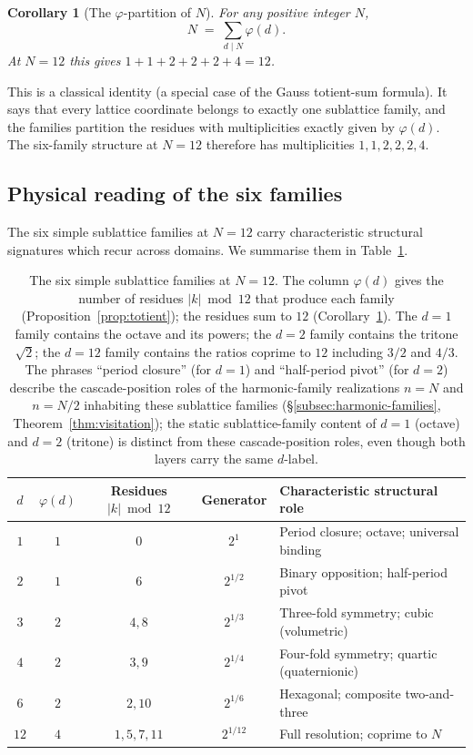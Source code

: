 \documentclass[11pt,a4paper]{article}
\newtheorem{corollary}[theorem]{Corollary}
\theoremstyle{definition}
\theoremstyle{remark}
\begin{document}
\begin{corollary}[The $\varphi$-partition of $N$]\label{cor:totientpartition}
For any positive integer $N$,
\[
N \;=\; \sum_{d\mid N}\varphi(d).
\]
At $N=12$ this gives $1+1+2+2+2+4=12$.
\end{corollary}

This is a classical identity (a special case of the Gauss totient-sum formula). It says that every lattice coordinate belongs to exactly one sublattice family, and the families partition the residues with multiplicities exactly given by $\varphi(d)$. The six-family structure at $N=12$ therefore has multiplicities $1,1,2,2,2,4$.

\subsection{Physical reading of the six families}

The six simple sublattice families at $N=12$ carry characteristic structural signatures which recur across domains. We summarise them in Table~\ref{tab:families}.

\begin{table}[h]
\centering
\begin{tabular}{@{}c c c c l@{}}
\toprule
$d$ & $\varphi(d)$ & Residues $|k|\bmod 12$ & Generator & Characteristic structural role\\
\midrule
$1$ & $1$ & $0$ & $2^{1}$ & Period closure; octave; universal binding\\
$2$ & $1$ & $6$ & $2^{1/2}$ & Binary opposition; half-period pivot\\
$3$ & $2$ & $4,8$ & $2^{1/3}$ & Three-fold symmetry; cubic (volumetric)\\
$4$ & $2$ & $3,9$ & $2^{1/4}$ & Four-fold symmetry; quartic (quaternionic)\\
$6$ & $2$ & $2,10$ & $2^{1/6}$ & Hexagonal; composite two-and-three\\
$12$ & $4$ & $1,5,7,11$ & $2^{1/12}$ & Full resolution; coprime to $N$\\
\bottomrule
\end{tabular}
\caption{The six simple sublattice families at $N=12$. The column $\varphi(d)$ gives the number of residues $|k|\bmod 12$ that produce each family (Proposition~\ref{prop:totient}); the residues sum to $12$ (Corollary~\ref{cor:totientpartition}). The $d=1$ family contains the octave and its powers; the $d=2$ family contains the tritone $\sqrt{2}$; the $d=12$ family contains the ratios coprime to $12$ including $3/2$ and $4/3$. The phrases ``period closure'' (for $d=1$) and ``half-period pivot'' (for $d=2$) describe the cascade-position roles of the harmonic-family realizations $n=N$ and $n=N/2$ inhabiting these sublattice families (\S\ref{subsec:harmonic-families}, Theorem~\ref{thm:visitation}); the static sublattice-family content of $d=1$ (octave) and $d=2$ (tritone) is distinct from these cascade-position roles, even though both layers carry the same $d$-label.}
\label{tab:families}
\end{table}
\end{document}
